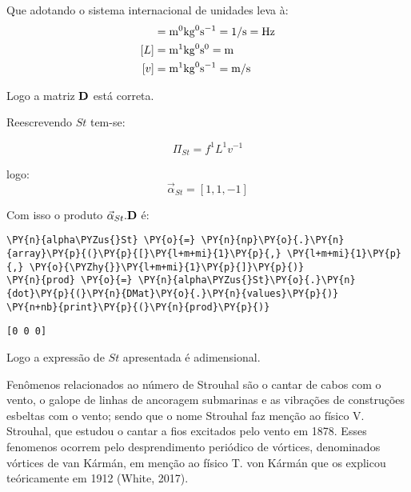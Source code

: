     
    Que adotando o sistema internacional de unidades leva à: \begin{align*}
[ f ] &= {\rm m}^{0}{\rm kg}^{0}{\rm s}^{-1} = 1/{\rm s} = {\rm Hz} \\
[ L ] &= {\rm m}^{1}{\rm kg}^{0}{\rm s}^{0} = {\rm m}  \\
[ v ] &= {\rm m}^{1}{\rm kg}^{0}{\rm s}^{-1} = {\rm m/s} \\
\end{align*}

Logo a matriz \(\bf D\) está correta.

Reescrevendo \(St\) tem-se:

\begin{equation}
\Pi_{St}=f^1L^1v^{-1}
\end{equation}

logo: \begin{equation}
\vec\alpha_{St}=[1, 1, -1]
\end{equation}

Com isso o produto \(\vec\alpha_{St}.\bf D\) é:

    \begin{tcolorbox}[breakable, size=fbox, boxrule=1pt, pad at break*=1mm,colback=cellbackground, colframe=cellborder]
\begin{Verbatim}[commandchars=\\\{\}]
\PY{n}{alpha\PYZus{}St} \PY{o}{=} \PY{n}{np}\PY{o}{.}\PY{n}{array}\PY{p}{(}\PY{p}{[}\PY{l+m+mi}{1}\PY{p}{,} \PY{l+m+mi}{1}\PY{p}{,} \PY{o}{\PYZhy{}}\PY{l+m+mi}{1}\PY{p}{]}\PY{p}{)}
\PY{n}{prod} \PY{o}{=} \PY{n}{alpha\PYZus{}St}\PY{o}{.}\PY{n}{dot}\PY{p}{(}\PY{n}{DMat}\PY{o}{.}\PY{n}{values}\PY{p}{)}
\PY{n+nb}{print}\PY{p}{(}\PY{n}{prod}\PY{p}{)}
\end{Verbatim}
\end{tcolorbox}

    \begin{Verbatim}[commandchars=\\\{\}]
[0 0 0]
    \end{Verbatim}

    Logo a expressão de \(St\) apresentada é adimensional.

    Fenômenos relacionados ao número de Strouhal são o cantar de cabos com o
vento, o galope de linhas de ancoragem submarinas e as vibrações de
construções esbeltas com o vento; sendo que o nome Strouhal faz menção
ao físico V. Strouhal, que estudou o cantar a fios excitados pelo vento
em 1878. Esses fenomenos ocorrem pelo desprendimento periódico de
vórtices, denominados vórtices de van Kármán, em menção ao físico T. von
Kármán que os explicou teóricamente em 1912 (White, 2017).

